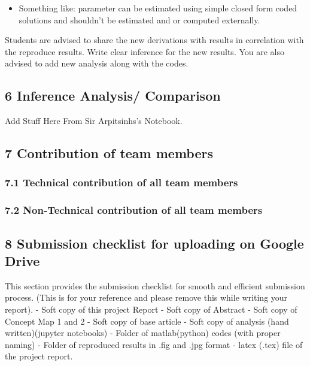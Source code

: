 \documentclass[11pt]{article}
\providecommand{\tightlist}{%
      \setlength{\itemsep}{0pt}\setlength{\parskip}{0pt}}
\begin{document}
\begin{itemize}
\tightlist
\item
  Something like: parameter can be estimated using simple closed form
  coded solutions and shouldn't be estimated and or computed externally.
\end{itemize}

Students are advised to share the new derivations with results in
correlation with the reproduce results. Write clear inference for the
new results. You are also advised to add new analysis along with the
codes.

\hypertarget{inference-analysis-comparison}{%
\subsection{6 Inference Analysis/
Comparison}\label{inference-analysis-comparison}}

Add Stuff Here From Sir Arpitsinhs's Notebook.

\hypertarget{contribution-of-team-members}{%
\subsection{7 Contribution of team
members}\label{contribution-of-team-members}}

\hypertarget{technical-contribution-of-all-team-members}{%
\subsubsection{7.1 Technical contribution of all team
members}\label{technical-contribution-of-all-team-members}}

\hypertarget{non-technical-contribution-of-all-team-members}{%
\subsubsection{7.2 Non-Technical contribution of all team
members}\label{non-technical-contribution-of-all-team-members}}

\hypertarget{submission-checklist-for-uploading-on-google-drive}{%
\subsection{8 Submission checklist for uploading on Google
Drive}\label{submission-checklist-for-uploading-on-google-drive}}

This section provides the submission checklist for smooth and efficient
submission process. (This is for your reference and please remove this
while writing your report). - Soft copy of this project Report - Soft
copy of Abstract - Soft copy of Concept Map 1 and 2 - Soft copy of base
article - Soft copy of analysis (hand written)(jupyter notebooks) -
Folder of matlab(python) codes (with proper naming) - Folder of
reproduced results in .fig and .jpg format - latex (.tex) file of the
project report.
\end{document}
